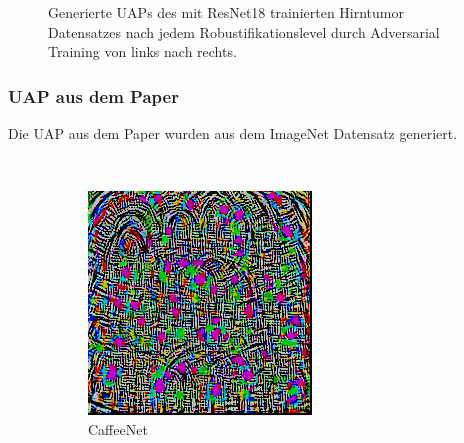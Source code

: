 \begin{figure}[H]
\begin{subfigure}{0.095\linewidth}
    \end{subfigure}
    \caption{Generierte UAPs des mit ResNet18 trainierten Hirntumor Datensatzes nach jedem Robustifikationslevel durch Adversarial Training von links nach rechts.}
    \label{fig:uap-verlauf-resnet18-mri-robustifikation}
\end{figure}




\subsubsection{UAP aus dem Paper}
Die UAP aus dem Paper wurden aus dem ImageNet Datensatz generiert. 
\begin{figure}[ht!]
    \centering
     \\
    \begin{subfigure}{0.16\linewidth}
        \centering
        \includegraphics[height=1\linewidth]{01-images/05-resultate/uap_paper/uap-paper-caffeenet.png}
        \caption{CaffeeNet}
    \end{subfigure}\hfill%
    \begin{subfigure}{0.16\linewidth}
        \centering

\end{subfigure}
\end{figure}
